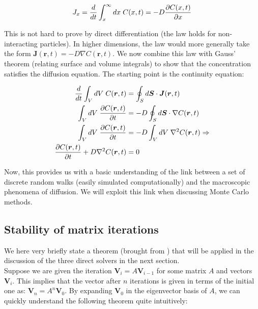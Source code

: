 \documentclass[a4paper, 11pt, notitlepage,english]{article}
\begin{document}
\begin{equation}
J_x = \frac{d}{dt} \int_x^{\infty} dx \hspace{1mm} C(x,t) = -D \frac{\partial C(x,t)}{\partial x}
\label{eq:Fick_law}
\end{equation}

This is not hard to prove by direct differentiation (the law holds for non-interacting particles). In higher dimensions, the law would more generally take the form $\boldsymbol{J}(\boldsymbol{r},t) = - D \nabla C(\boldsymbol{r},t)$. We now combine this law with Gauss' theorem (relating surface and volume integrals) to show that the concentration satisfies the diffusion equation. The starting point is the continuity equation:

\begin{align}
 \frac{d}{dt} \int_V dV \hspace{1mm} C(\boldsymbol{r},t) &= \oint_S d\boldsymbol{S} \cdot \boldsymbol{J}(\boldsymbol{r},t) \\
 \int_V dV \hspace{1mm} \frac{\partial C(\boldsymbol{r},t)}{\partial t} &= -D\oint_S d\boldsymbol{S} \cdot \nabla C(\boldsymbol{r},t) \\
  \int_V dV \hspace{1mm} \frac{\partial C(\boldsymbol{r},t)}{\partial t} &= -D\int_V dV \hspace{1mm} \nabla^2 C(\boldsymbol{r},t) \Rightarrow  \\
  \frac{\partial C(\boldsymbol{r},t)}{\partial t} + D \nabla^2 C(\boldsymbol{r},t) &= 0
\label{eq:Diffusion_Gauss_theorem}
\end{align}

Now, this provides us with a basic understanding of the link between a set of  discrete random walks (easily simulated computationally) and the macroscopic phenomena of diffusion. We will exploit this link when discussing Monte Carlo methods.


\subsection{Stability of matrix iterations}
We here very briefly state a theorem (brought from \cite{Komp3150}) that will be applied in the discussion of the three direct solvers in the next section. \\

Suppose we are given the iteration $\boldsymbol{V}_i = A \boldsymbol{V}_{i-1}$ for some matrix $A$ and vectors $\boldsymbol{V}_i$. This implies that the vector after $n$ iterations is given in terms of the initial one as: $\boldsymbol{V}_n = A^n \boldsymbol{V}_0$. By expanding $\boldsymbol{V}_0$ in the eigenvector basis of $A$, we can quickly understand the following theorem quite intuitively: \\
\end{document}

